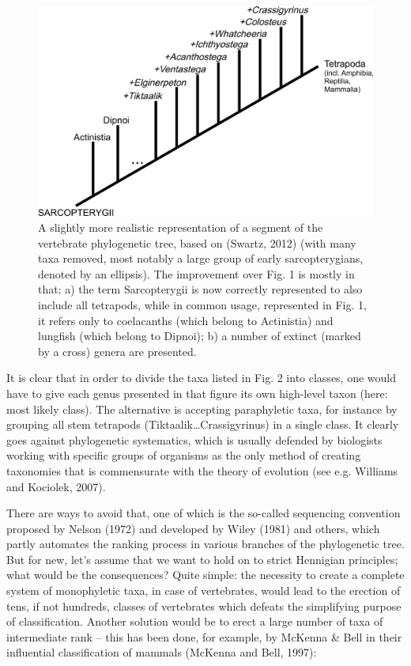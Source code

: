 \begin{artengenv}
\begin{figure}[h]
	\centering
	\includegraphics[width=1\textwidth]{PAU_Lamza/Lamzaorg-img002.jpg}
	\caption{A slightly more realistic representation of a segment of the vertebrate phylogenetic tree, based on
		\label{ref:RNDPuknxVrJnD}(Swartz, 2012) (with many taxa removed, most notably a large group of early sarcopterygians,
		denoted by an ellipsis). The improvement over Fig. 1 is mostly in that: a) the term Sarcopterygii is now correctly
		represented to also include all tetrapods, while in common usage, represented in Fig. 1, it refers only to coelacanths
		(which belong to Actinistia) and lungfish (which belong to Dipnoi); b) a number of extinct (marked by a cross) genera
		are presented.}
	\label{lamza-fig2}
\end{figure}

It is clear that in order to divide the taxa listed in Fig. 2 into classes, one would have to give each genus presented
in that figure its own high-level taxon (here: most likely class). The alternative is accepting paraphyletic taxa, for
instance by grouping all stem tetrapods (Tiktaalik\ldots Crassigyrinus) in a single class. It clearly goes against
phylogenetic systematics, which is usually defended by biologists working with specific groups of organisms as the only
method of creating taxonomies that is commensurate with the theory of evolution \label{ref:RNDkC4ruFguZT}(see e.g.
Williams and Kociolek, 2007).

There are ways to avoid that, one of which is the so-called sequencing convention proposed by Nelson
\label{ref:RNDHQubFlpSOG}(1972) and developed by Wiley \label{ref:RNDoeFoXTp1sn}(1981) and others, which partly
automates the ranking process in various branches of the phylogenetic tree. But for new, let’s assume that we want to
hold on to strict Hennigian principles; what would be the consequences? Quite simple: the necessity to create a
complete system of monophyletic taxa, in case of vertebrates, would lead to the erection of tens, if not hundreds,
classes of vertebrates which defeats the simplifying purpose of classification. Another solution would be to erect a
large number of taxa of intermediate rank – this has been done, for example, by McKenna \& Bell in their influential
classification of mammals \label{ref:RNDTh5Uw8JZAm}(McKenna and Bell, 1997):


\end{artengenv}
